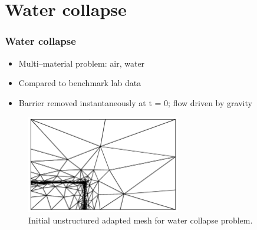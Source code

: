\section{Water collapse}

\begin{frame}
    \frametitle{Water collapse}
\begin{itemize}
\item Multi--material problem: air, water
\item Compared to benchmark lab data
\item Barrier removed instantaneously at t = 0; flow driven by gravity
\end{itemize}

\begin{figure}
\centering
\includegraphics[width=0.6\textwidth, clip=true]{./water_collapse/water_collapse_0_mesh.pdf}
\caption{Initial unstructured adapted mesh for water collapse problem.}
\end{figure}

\end{frame}
%
